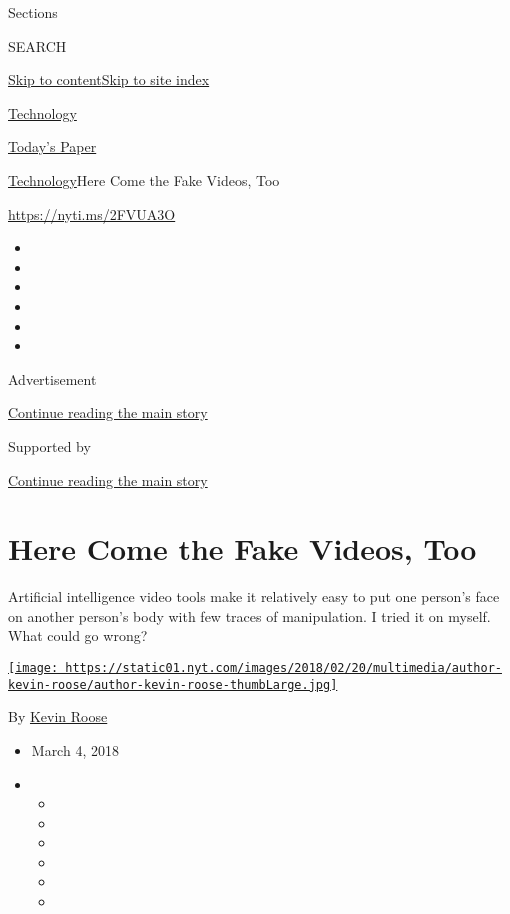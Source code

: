 Sections

SEARCH

\protect\hyperlink{site-content}{Skip to
content}\protect\hyperlink{site-index}{Skip to site index}

\href{https://www.nytimes.com/section/technology}{Technology}

\href{https://myaccount.nytimes.com/auth/login?response_type=cookie\&client_id=vi}{}

\href{https://www.nytimes.com/section/todayspaper}{Today's Paper}

\href{/section/technology}{Technology}\textbar{}Here Come the Fake
Videos, Too

\href{https://nyti.ms/2FVUA3O}{https://nyti.ms/2FVUA3O}

\begin{itemize}
\item
\item
\item
\item
\item
\item
\end{itemize}

Advertisement

\protect\hyperlink{after-top}{Continue reading the main story}

Supported by

\protect\hyperlink{after-sponsor}{Continue reading the main story}

\hypertarget{here-come-the-fake-videos-too}{%
\section{Here Come the Fake Videos,
Too}\label{here-come-the-fake-videos-too}}

Artificial intelligence video tools make it relatively easy to put one
person's face on another person's body with few traces of manipulation.
I tried it on myself. What could go wrong?

\href{https://www.nytimes.com/by/kevin-roose}{\texttt{[image: https://static01.nyt.com/images/2018/02/20/multimedia/author-kevin-roose/author-kevin-roose-thumbLarge.jpg]}}

By \href{https://www.nytimes.com/by/kevin-roose}{Kevin Roose}

\begin{itemize}
\item
  March 4, 2018
\item
  \begin{itemize}
  \item
  \item
  \item
  \item
  \item
  \item
  \end{itemize}
\end{itemize}

